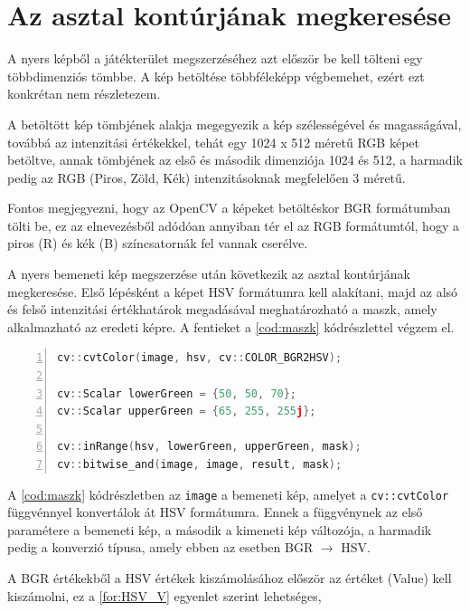 \section{Az asztal kontúrjának megkeresése}
\label{section:megv_asztal_kontur}
A nyers képből a játékterület megszerzéséhez azt először be kell tölteni egy többdimenziós tömbbe. A kép betöltése többféleképp végbemehet, ezért ezt konkrétan nem részletezem.
\par A betöltött kép tömbjének alakja megegyezik a kép szélességével és magasságával, továbbá az intenzitási értékekkel, tehát egy 1024 x 512 méretű RGB képet betöltve, annak tömbjének az első és második dimenziója 1024 és 512, a harmadik pedig az RGB (Piros, Zöld, Kék) intenzitásoknak megfelelően 3 méretű.
\par Fontos megjegyezni, hogy az OpenCV a képeket betöltéskor BGR formátumban tölti be, ez az elnevezésből adódóan annyiban tér el az RGB formátumtól, hogy a piros (R) és kék (B) színcsatornák fel vannak cserélve.
\par A nyers bemeneti kép megszerzése után következik az asztal kontúrjának megkeresése. Első lépésként a képet HSV formátumra kell alakítani, majd az alsó és felső intenzitási értékhatárok megadásával meghatározható a maszk, amely alkalmazható az eredeti képre.
\newline A fentieket a \ref{cod:maszk} kódrészlettel végzem el.


\vspace{2mm}
\hspace{-10mm}
\begin{minipage}{\linewidth}
\begin{lstlisting}[language=C++, numbers=left, caption={A játékterület maszkolása.}, label={cod:maszk}]
cv::cvtColor(image, hsv, cv::COLOR_BGR2HSV);

cv::Scalar lowerGreen = {50, 50, 70};
cv::Scalar upperGreen = {65, 255, 255j};

cv::inRange(hsv, lowerGreen, upperGreen, mask);
cv::bitwise_and(image, image, result, mask);
\end{lstlisting}
\end{minipage}

\par A \ref{cod:maszk} kódrészletben az \lstinline{image} a bemeneti kép, amelyet a \lstinline{cv::cvtColor} függvénnyel \cite{opencv_docs} konvertálok át HSV formátumra. Ennek a függvénynek az első paramétere a bemeneti kép, a második a kimeneti kép változója, a harmadik pedig a konverzió típusa, amely ebben az esetben BGR $\rightarrow$ HSV.
\par A BGR értékekből a HSV értékek kiszámolásához először az értéket (Value) kell kiszámolni, ez a \ref{for:HSV_V} egyenlet\cite{opencv_docs} szerint lehetséges,

